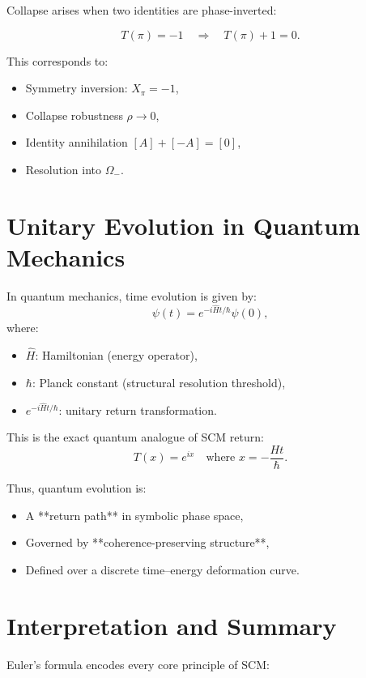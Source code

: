 Collapse arises when two identities are phase-inverted:

\[
T(\pi) = -1 \quad \Rightarrow \quad T(\pi) + 1 = 0.
\]

This corresponds to:
\begin{itemize}
    \item Symmetry inversion: \( X_\pi = -1 \),
    \item Collapse robustness \( \rho \to 0 \),
    \item Identity annihilation \( [A] + [-A] = [0] \),
    \item Resolution into \( \Omega_- \).
\end{itemize}

\section{Unitary Evolution in Quantum Mechanics}

In quantum mechanics, time evolution is given by:
\begin{equation}
    \psi(t) = e^{-i \hat{H} t / \hbar} \psi(0),
\end{equation}
where:
\begin{itemize}
    \item \( \hat{H} \): Hamiltonian (energy operator),
    \item \( \hbar \): Planck constant (structural resolution threshold),
    \item \( e^{-i \hat{H} t / \hbar} \): unitary return transformation.
\end{itemize}

This is the exact quantum analogue of SCM return:
\[
T(x) = e^{ix} \quad \text{where } x = -\frac{Ht}{\hbar}.
\]

\noindent Thus, quantum evolution is:
\begin{itemize}
    \item A **return path** in symbolic phase space,
    \item Governed by **coherence-preserving structure**,
    \item Defined over a discrete time–energy deformation curve.
\end{itemize}

\section{Interpretation and Summary}

Euler’s formula encodes every core principle of SCM:

